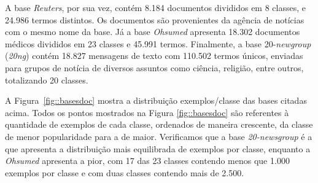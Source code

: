 A base \textit{Reuters}, por sua vez, contém 8.184 documentos divididos em 8 classes, e 24.986 termos distintos. Os documentos são provenientes da agência de notícias com o mesmo nome da base. 
Já a base \textit{Ohsumed} apresenta 18.302 documentos médicos divididos em 23 classes e 45.991 termos.
Finalmente, a base 20-\textit{newgroup} (\textit{20ng}) contém 18.827 mensagens de texto com 110.502 termos únicos, enviadas para grupos de notícia de diversos assuntos como ciência, religião, entre outros, totalizando 20 classes.

A Figura~\ref{fig::basesdoc} mostra a distribuição exemplos/classe das bases citadas acima. 
Todos os pontos mostrados na Figura \ref{fig::basesdoc} são referentes à quantidade de exemplos de cada classe, ordenados de maneira crescente, da classe de menor popularidade para a de maior. Verificamos que a base \textit{20-newsgroup} é a que apresenta a distribuição mais equilibrada de exemplos por classe, enquanto a \textit{Ohsumed} apresenta a pior, com 17 das 23 classes contendo menos que 1.000 exemplos por classe e com duas classes contendo mais de 2.500.

